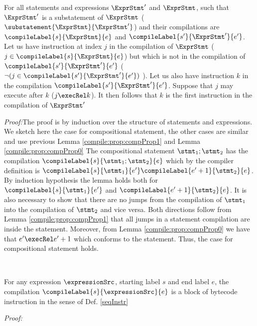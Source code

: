 \begin{compPropApp}\label{compile:prop:compProp2}
 For all  statements and expressions $\ExprStmt'$  and $\ExprStmt$, such that $\ExprStmt'$  is a substatement of
 $\ExprStmt$ ($\substatement{\ExprStmt }{\ExprStmt'}$)
 and their  compilations  are $\compileLabel{s}{\ExprStmt}{e}$ and  $\compileLabel{s'}{\ExprStmt'}{e'}$. Let us have instruction at index $j$ 
 in the compilation of  $\ExprStmt$ ( $j \in \compileLabel{s}{\ExprStmt}{e}$)
 but which is not in the compilation of  $\compileLabel{s'}{\ExprStmt'}{e'}  $ ( $\neg (j \in \compileLabel{s'}{\ExprStmt'}{e'} ) $ ).
 Let us also have instruction $k$ in the compilation   $ \compileLabel{s'}{\ExprStmt'}{e'}$. 
  Suppose that $j$ may execute after $k$ ($ j \execRel k$). It then follows that  $k$ is the first instruction in the compilation of  $ \ExprStmt'$
 \end{compPropApp}
  \textit{Proof:}The proof is by induction over the structure of statements and expressions. %
We sketch here the case for compositional statement, the other cases are similar and use previous Lemma \ref{compile:prop:compProp1} and Lemma \ref{compile:prop:compProp0}
The compositional statement $\stmt_1;\stmt_2$ has the compilation $ \compileLabel{s}{\stmt_1;\stmt_2}{e}$ which by the compiler definition is 
 $ \compileLabel{s}{\stmt_1}{e'} \compileLabel{e'+1}{\stmt_2}{e}$. By induction hypothesis the lemma holds both for   $ \compileLabel{s}{\stmt_1}{e'}$
and $\compileLabel{e'+1}{\stmt_2}{e}$. It is also necessary to show that there are no jumps from the compilation of $\stmt_1$ into the compilation of
$\stmt_2$ and vice versa. Both directions follow from Lemma \ref{compile:prop:compProp1} that all jumps in a statement compilation are inside the statement.
Moreover, from Lemma \ref{compile:prop:compProp0} we have that $e' \execRel e'+1$ which conforms to the statement.
Thus, the  case for compositional statement holds.
 

\Qed \\





\begin{compProp3A}
    For any expression $\expressionSrc$, starting label $s$ and end label $e$,
    the compilation $\compileLabel{s}{\expressionSrc}{e}$ is a block of bytecode instruction in the sense of Def. \ref{seqInstr}
   
\end{compProp3A}
\textit{Proof:}

